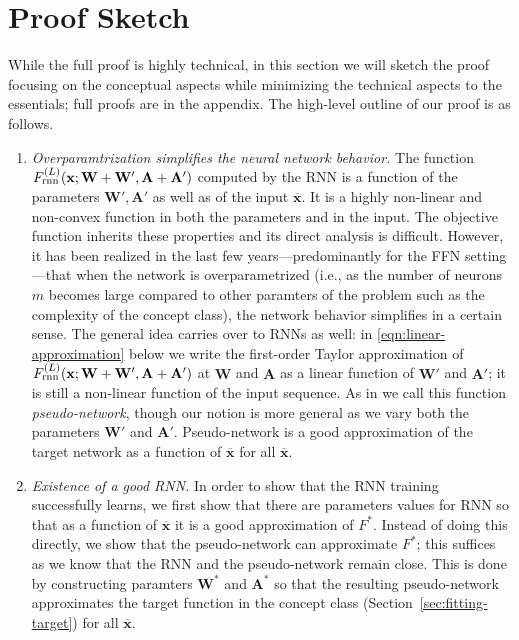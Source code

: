 \section{Proof Sketch}
While the full proof is highly technical, in this section we will sketch the proof focusing on the conceptual aspects while minimizing the technical aspects to the essentials; full proofs are in the appendix. The high-level outline of our proof is as follows.
\begin{enumerate}[leftmargin=*, itemsep=0.1pt, topsep=0pt]
	\item \emph{Overparamtrization simplifies the neural network behavior.} The function $F_{\mathrm{rnn}}^{(L)}(\mathbf{x}; \mathbf{W}+\mathbf{W}', \mathbf{A} + \mathbf{A}')$ computed by the RNN is a function of the parameters $\mathbf{W}', \mathbf{A}'$ as well as of the input $\overline{\mathbf{x}}$. It is a highly non-linear and non-convex function in both the parameters and in the input. The objective function inherits these properties and its direct analysis is difficult. However, it has been realized in the last few years---predominantly for the FFN setting---that when the network is overparametrized (i.e., as the number of neurons $m$ becomes large compared to other paramters of the problem such as the complexity of the concept class), the network behavior simplifies in a certain sense. The general idea carries over to RNNs as well:
	in \eqref{eqn:linear-approximation} below we write the first-order Taylor approximation of $F_{\mathrm{rnn}}^{(L)}(\mathbf{x}; \mathbf{W}+\mathbf{W}', \mathbf{A} + \mathbf{A}')$
	at $\mathbf{W}$ and $\mathbf{A}$ as a linear function of  $\mathbf{W}'$ and $\mathbf{A}'$; it is still a non-linear function of the input sequence. As in \cite{allen2019can} we call this function \emph{pseudo-network}, though our notion is more general as we vary both the parameters $\mathbf{W}'$ and $\mathbf{A}'$. Pseudo-network is a good approximation of the target network as a function of $\overline{\mathbf{x}}$ for all $\overline{\mathbf{x}}$. 
	\item \emph{Existence of a good RNN.} In order to show that the RNN training successfully learns, we first show that there are parameters values for RNN so that as a function of $\overline{\mathbf{x}}$ it is a good approximation of $F^\ast$. Instead of doing this directly, we show that the pseudo-network can approximate $F^\ast$; this suffices as we know that the RNN and the pseudo-network remain close. This is done by constructing paramters $\mathbf{W}^{\ast}$ and $\mathbf{A}^{\ast}$ so that the resulting pseudo-network approximates the target function in the concept class (Section~\ref{sec:fitting-target}) for all $\overline{\mathbf{x}}$. 

\end{enumerate}
